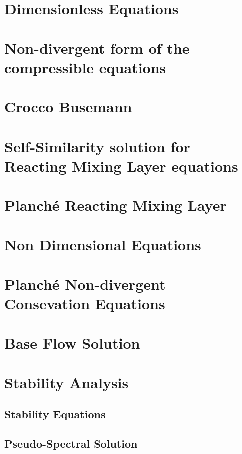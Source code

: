 \documentclass[preprint,12pt]{elsarticle}
\begin{document}
\section{Dimensionless Equations}
%

\section{Non-divergent form of the compressible equations}
%

\section{Crocco Busemann} %
%

\section{Self-Similarity solution for Reacting Mixing Layer equations}
%
%

\section{Planché Reacting Mixing Layer} %


\section {Non Dimensional Equations}
%

\section{Planché Non-divergent Consevation Equations} %
%

\section{Base Flow Solution}
%

\section{Stability Analysis}
%

\subsection{Stability Equations}


\subsection{Pseudo-Spectral Solution}





\end{document}
